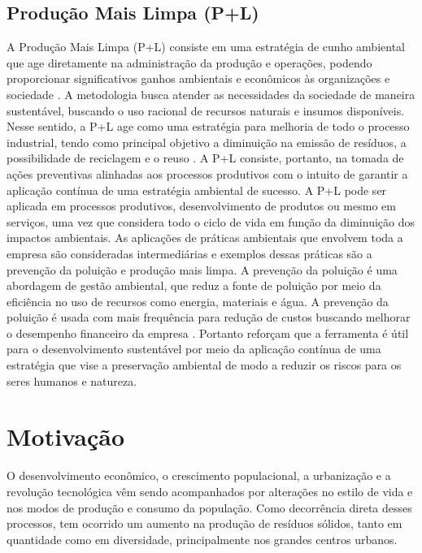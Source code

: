 \documentclass[
	12pt,				%
	openany,			%
	twoside,			%
	a4paper,			%
	english,			%
	french,				%
	spanish,			%
	brazil				%
	]{abntex2}
\begin{document}
\subsection{Produção Mais Limpa (P+L)}
A Produção Mais Limpa (P+L) consiste em uma estratégia de cunho ambiental que age diretamente na administração da produção e operações, podendo proporcionar significativos ganhos ambientais e econômicos às organizações e sociedade \cite{saqf}.
A metodologia busca atender as necessidades da sociedade de maneira sustentável, buscando o uso racional de recursos naturais e insumos disponíveis. Nesse sentido, a P+L age como uma estratégia para melhoria de todo o processo industrial, tendo como principal objetivo a diminuição na emissão de resíduos, a possibilidade de reciclagem e o reuso \cite{ascf}. 
A P+L consiste, portanto, na tomada de ações preventivas alinhadas aos processos produtivos com o intuito de garantir a aplicação contínua de uma estratégia ambiental de sucesso.  A P+L pode ser aplicada em processos produtivos, desenvolvimento de produtos ou mesmo em serviços, uma vez que considera todo o ciclo de vida em função da diminuição dos impactos ambientais. As aplicações de práticas ambientais que envolvem toda a empresa são consideradas intermediárias e exemplos dessas práticas são a prevenção da poluição e produção mais limpa. A prevenção da poluição é uma abordagem de gestão ambiental, que reduz a fonte de poluição por meio da eficiência no uso de recursos como energia, materiais e água. A prevenção da poluição é usada com mais frequência para redução de custos buscando melhorar o desempenho financeiro da empresa \cite{hnpt}.
Portanto \cite{sea} reforçam que a ferramenta é útil para o desenvolvimento sustentável por meio da aplicação contínua de uma estratégia que vise a preservação ambiental de modo a reduzir os riscos para os seres humanos e natureza.




\section{Motivação}
O desenvolvimento econômico, o crescimento populacional, a urbanização e a revolução tecnológica vêm sendo acompanhados por alterações no estilo de vida e nos modos de produção e consumo da população. Como decorrência direta desses processos, tem ocorrido um aumento na produção de resíduos sólidos, tanto em quantidade como em diversidade, principalmente nos grandes centros urbanos. \cite{anjoseferreira}
\end{document}
